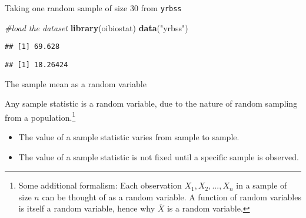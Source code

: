 \documentclass[
  ignorenonframetext,
  aspectratio=169]{beamer}
\newenvironment{Shaded}{\begin{snugshade}}{\end{snugshade}}
\newcommand{\CommentTok}[1]{\textcolor[rgb]{0.56,0.35,0.01}{\textit{#1}}}
\newcommand{\DecValTok}[1]{\textcolor[rgb]{0.00,0.00,0.81}{#1}}
\newcommand{\FunctionTok}[1]{\textcolor[rgb]{0.13,0.29,0.53}{\textbf{#1}}}
\newcommand{\NormalTok}[1]{#1}
\newcommand{\OtherTok}[1]{\textcolor[rgb]{0.56,0.35,0.01}{#1}}
\newcommand{\SpecialCharTok}[1]{\textcolor[rgb]{0.81,0.36,0.00}{\textbf{#1}}}
\newcommand{\StringTok}[1]{\textcolor[rgb]{0.31,0.60,0.02}{#1}}
\begin{document}
\begin{frame}[fragile]{Taking one random sample of size 30 from
\texttt{yrbss}}
\protect\hypertarget{taking-one-random-sample-of-size-30-from-yrbss}{}
\footnotesize

\begin{Shaded}
\begin{Highlighting}[]
\CommentTok{\#load the dataset}
\FunctionTok{library}\NormalTok{(oibiostat)}
\FunctionTok{data}\NormalTok{(}\StringTok{"yrbss"}\NormalTok{)}
\end{Highlighting}
\end{Shaded}

\begin{Shaded}
\end{Shaded}

\begin{verbatim}
## [1] 69.628
\end{verbatim}

\begin{verbatim}
## [1] 18.26424
\end{verbatim}

\normalsize
\end{frame}

\begin{frame}{The sample mean as a random variable}
\protect\hypertarget{the-sample-mean-as-a-random-variable}{}
\small

Any sample statistic is a random variable, due to the nature of random
sampling from a
population.\footnote{Some additional formalism: Each observation $X_1, X_2, ..., X_n$ in a sample of size $n$ can be thought of as a random variable. A function of random variables is itself a random variable, hence why $\overline{X}$ is a random variable.}

\begin{itemize}
\item
  The value of a sample statistic varies from sample to sample.
\item
  The value of a sample statistic is not fixed until a specific sample
  is observed.
\end{itemize}
\end{frame}
\end{document}

